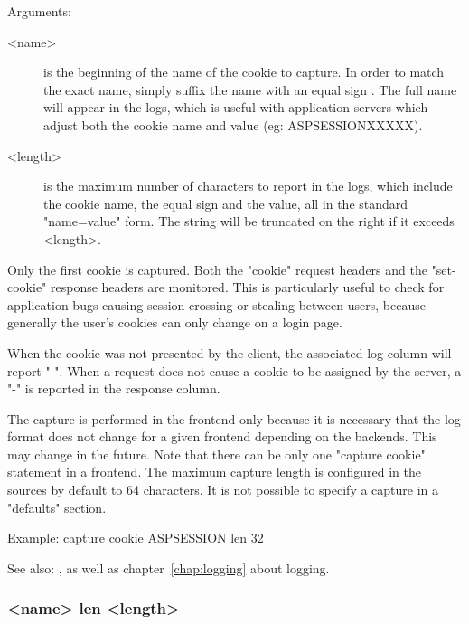   Arguments:
  \begin{description} 
  \item[<name>]    is the beginning of the name of the cookie to capture. In order
              to match the exact name, simply suffix the name with an equal
              sign \chr{=}. The full name will appear in the logs, which is
              useful with application servers which adjust both the cookie name
              and value (eg: ASPSESSIONXXXXX).

  \item[<length>]  is the maximum number of characters to report in the logs, which
              include the cookie name, the equal sign and the value, all in the
              standard "name=value" form. The string will be truncated on the
              right if it exceeds <length>.
  \end{description}

  Only the first cookie is captured. Both the "cookie" request headers and the
  "set-cookie" response headers are monitored. This is particularly useful to
  check for application bugs causing session crossing or stealing between
  users, because generally the user's cookies can only change on a login page.

  When the cookie was not presented by the client, the associated log column
  will report "-". When a request does not cause a cookie to be assigned by the
  server, a "-" is reported in the response column.

  The capture is performed in the frontend only because it is necessary that
  the log format does not change for a given frontend depending on the
  backends. This may change in the future. Note that there can be only one
  "capture cookie" statement in a frontend. The maximum capture length is
  configured in the sources by default to 64 characters. It is not possible to
  specify a capture in a "defaults" section.

  \begin{example}{Example:}
  capture cookie ASPSESSION len 32
  \end{example}
  
  See also: ,  as well as
            chapter~\ref{chap:logging} about logging.

\subsubsection[capture request header]{ <name> len <length>}
  
